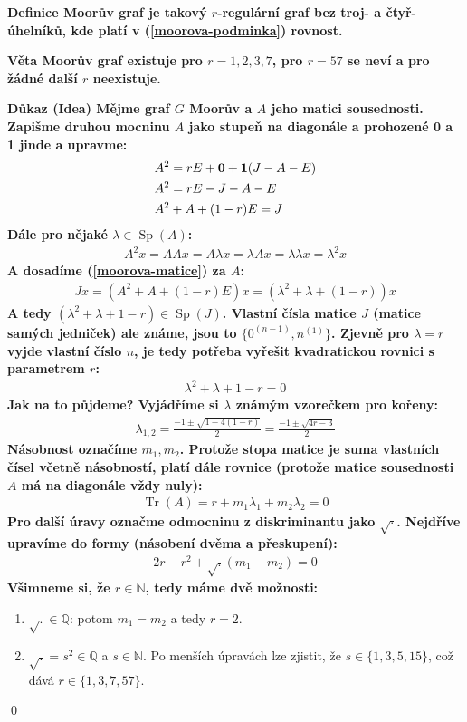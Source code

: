 \documentclass[a4paper,12pt,titlepage]{article}
\newcommand{\dk}{\smallskip\noindent\bf Důkaz\rm{} }
\newcommand{\df}{\smallskip\noindent\bf Definice\rm{} }
\newcommand{\vt}{\smallskip\noindent\bf Věta\rm{} }
\newcommand{\Q}{\mathbb{Q}}
\newcommand{\N}{\mathbb{N}}
\DeclareMathOperator{\Sp}{Sp}
\DeclareMathOperator{\Tr}{Tr}
\begin{document}
\df Moorův graf je takový $r$-regulární graf bez troj- a čtyř-úhelníků, kde 
platí v (\ref{moorova-podminka}) rovnost.

\vt Moorův graf existuje pro $r=1,2,3,7$, pro $r=57$ se neví a pro žádné další 
$r$ neexistuje.

\dk (Idea) Mějme graf $G$ Moorův a $A$ jeho matici sousednosti. Zapišme druhou 
mocninu $A$ jako stupeň na diagonále a prohozené 0 a 1 jinde a upravme:
\begin{align}
	&A^2 = rE + {\bf0} + {\bf1}(J- A-E) \\
	&A^2 = rE - J - A - E \\
	\label{moorova-matice}&A^2 + A + (1-r)E = J
\end{align}
Dále pro nějaké $\lambda\in \Sp(A)$:
\begin{align}
	\label{moorova-mocnina}A^2 x = AAx = A\lambda x = \lambda A x = \lambda 
	\lambda x = \lambda^2 x
\end{align}
A dosadíme (\ref{moorova-matice}) za $A$:
\begin{align}
	Jx = (A^2 + A + (1-r)E)x = (\lambda^2 + \lambda + (1-r))x
\end{align}
A tedy $(\lambda^2 + \lambda + 1 -r) \in \Sp(J)$. Vlastní čísla matice $J$ 
(matice samých jedniček) ale známe, jsou to $\{0^{(n-1)}, n^{(1)}\}$. Zjevně pro 
$\lambda = r$ vyjde vlastní číslo $n$, je tedy potřeba vyřešit kvadratickou 
rovnici s parametrem $r$:
\begin{align}
	\lambda^2 + \lambda + 1 - r = 0
\end{align}
Jak na to půjdeme? Vyjádříme si $\lambda$ známým vzorečkem pro kořeny:
\begin{align}
	\lambda_{1,2} = \frac{-1\pm \sqrt{1-4(1-r)}}{2} = \frac{-1\pm\sqrt{4r-3}}{2}
\end{align}
Násobnost označíme $m_1, m_2$. Protože stopa matice je suma vlastních čísel 
včetně násobností, platí dále rovnice (protože matice sousednosti $A$ má na 
diagonále vždy nuly):
\begin{align}
	\Tr(A) = r+m_1\lambda_1 + m_2\lambda_2 = 0
\end{align}
Pro další úravy označme odmocninu z diskriminantu jako $\sqrt{\cdot}$. Nejdříve 
upravíme do formy (násobení dvěma a přeskupení):
\begin{align}
	2r - r^2 + \sqrt{.}(m_1 - m_2) = 0
\end{align}
Všimneme si, že $r\in\N$, tedy máme dvě možnosti:
\begin{enumerate}
	\item $\sqrt{.} \in \Q$: potom $m_1 = m_2$ a tedy $r = 2$.
	\item $\sqrt{.} = s^2 \in \Q$ a $s \in \N$. Po menších úpravách lze zjistit, 
	že $s\in \{1, 3, 5, 15\}$, což dává $r\in\{1, 3,7,57\}$.
\end{enumerate}
\qed
\end{document}
